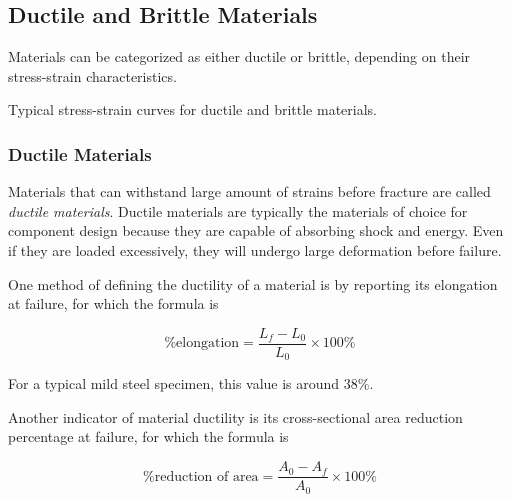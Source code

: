 \documentclass[
10pt,
a4paper,
openany,
svgnames,
]{kaobook} %
\begin{document}
\subsection{Ductile and Brittle Materials}

Materials can be categorized as either ductile or brittle, depending on their stress-strain characteristics.

\begin{marginfigure}
  \caption{Typical stress-strain curves for ductile and brittle materials.}
\end{marginfigure}

\subsubsection{Ductile Materials}

Materials that can withstand large amount of strains before fracture are called \emph{ductile materials}. Ductile materials are typically the materials of choice for component design because they are capable of absorbing shock and energy. Even if they are loaded excessively, they will undergo large deformation before failure.

One method of defining the ductility of a material is by reporting its elongation at failure, for which the formula is

\begin{equation}
  \text{\% elongation} = \frac{L_f - L_0}{L_0} \times 100\%
\end{equation}

For a typical mild steel specimen, this value is around 38\%.

Another indicator of material ductility is its cross-sectional area reduction percentage at failure, for which the formula is

\begin{equation}
  \text{\% reduction of area} = \frac{A_0 - A_f}{A_0} \times 100\%
\end{equation}
\end{document}
